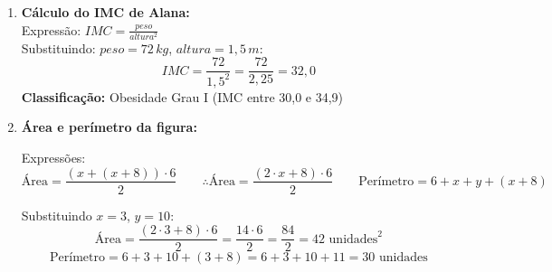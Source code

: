 \documentclass[a4paper]{article}
\begin{document}
\begin{enumerate}
		\item \textbf{Cálculo do IMC de Alana:} \\
		Expressão: $\displaystyle IMC = \frac{peso}{altura^2}$ \\
		Substituindo: $peso = 72\,kg$, $altura = 1{,}5\,m$:
		\[
		IMC = \frac{72}{1{,}5^2} = \frac{72}{2{,}25} = \boxed{32{,}0}
		\]
		\textbf{Classificação:} Obesidade Grau I (IMC entre 30,0 e 34,9)
		
		\item \textbf{Área e perímetro da figura:}
		
		Expressões:
		\[
		\text{Área} = \frac{(x + (x+8)) \cdot 6}{2} \qquad \therefore \text{Área} = \frac{(2 \cdot x+8) \cdot 6}{2} \qquad \text{Perímetro} = 6 + x + y + (x+8)
		\]
		
		Substituindo $x = 3$, $y = 10$:
		\[
		\text{Área} = \frac{(2 \cdot 3+8) \cdot 6}{2} = \frac{14 \cdot 6}{2} = \frac{84}{2} = \boxed{42 \text{ unidades}^2}
		\]
		\[
		\text{Perímetro} = 6 + 3 + 10 + (3 + 8) = 6 + 3 + 10 + 11 = \boxed{30 \text{ unidades}}
		\]
	\end{enumerate}
\end{document}
